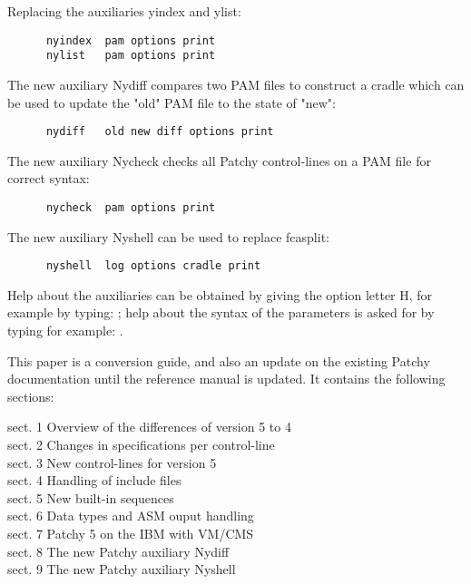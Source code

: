 Replacing the auxiliaries yindex and ylist:

\begin{verbatim}
      nyindex  pam options print
      nylist   pam options print
\end{verbatim}

The new auxiliary Nydiff compares two PAM files to construct a cradle
which can be used to update the "old" PAM file to the state of "new":

\begin{verbatim}
      nydiff   old new diff options print
\end{verbatim}

The new auxiliary Nycheck checks all Patchy control-lines on a PAM file
for correct syntax:

\begin{verbatim}
      nycheck  pam options print
\end{verbatim}

The new auxiliary Nyshell can be used to replace fcasplit:

\begin{verbatim}
      nyshell  log options cradle print
\end{verbatim}

Help about the auxiliaries can be obtained by giving the option letter H,
for example by typing: ; help about the syntax of the
parameters is asked for by typing for example: .


This paper is a conversion guide, and also an update on the existing
Patchy documentation until the reference manual is updated. It contains
the following sections:

\begin{flushleft}
    sect. 1  Overview of the differences of version 5 to 4\\
    sect. 2  Changes in specifications per control-line   \\
    sect. 3  New control-lines for version 5              \\
    sect. 4  Handling of include files                    \\
    sect. 5  New built-in sequences                       \\ 
    sect. 6  Data types and ASM ouput handling            \\ 
    sect. 7  Patchy 5 on the IBM with VM/CMS              \\
    sect. 8  The new Patchy auxiliary Nydiff              \\
    sect. 9  The new Patchy auxiliary Nyshell
\end{flushleft}


